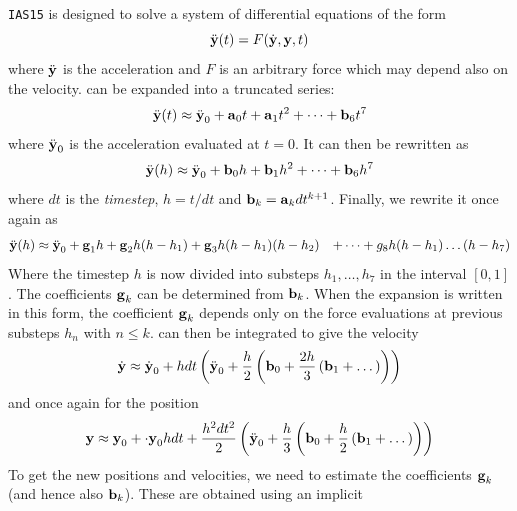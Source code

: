 \documentclass[ twoside,openright,titlepage,numbers=noenddot,headinclude,%
                footinclude=true,cleardoublepage=empty,abstractoff, %
                BCOR=5mm,paper=a4,fontsize=11pt,%
                american,%
                ]{scrreprt}
\begin{document}
\texttt{IAS15} is designed to solve a system of differential equations of the form
\begin{equation}
    \ddot{\boldsymbol{\mathbf{y}}}(t)=F(\dot{\boldsymbol{\mathbf{y}}},\boldsymbol{\mathbf{y}},t)
    \label{eq:diff_eq}
\end{equation}
where $\ddot{\boldsymbol{\mathbf{y}}}$ is the acceleration and $F$ is an arbitrary force
which may depend also on the velocity.  can be expanded
into a truncated series:
\begin{equation}
    \ddot{\boldsymbol{\mathbf{y}}}(t)\approx \ddot{\boldsymbol{\mathbf{y}}}_0 + \boldsymbol{\mathbf{a}}_0t+\boldsymbol{\mathbf{a}}_1t^2
    +\dots+\boldsymbol{\mathbf{b}}_6t^7
\end{equation}
where $\ddot{\boldsymbol{\mathbf{y}}}_0$ is the acceleration evaluated at $t=0$. 
It can then be rewritten as
\begin{equation}
    \ddot{\boldsymbol{\mathbf{y}}}(h)\approx \ddot{\boldsymbol{\mathbf{y}}}_0 + \boldsymbol{\mathbf{b}}_0h+\boldsymbol{\mathbf{b}}_1h^2
    +\dots+\boldsymbol{\mathbf{b}}_6h^7
    \label{eq:diff_eq2}
\end{equation}
where $dt$ is the \emph{timestep}, $h=t/dt$ and $\boldsymbol{\mathbf{b}}_k=\boldsymbol{\mathbf{a}}_kdt^{k+1}$.
Finally, we rewrite it once again as
\begin{equation}
    \begin{aligned}
        \ddot{\boldsymbol{\mathbf{y}}}(h)&\approx \ddot{\boldsymbol{\mathbf{y}}}_0 + \boldsymbol{\mathbf{g}}_1h+\boldsymbol{\mathbf{g}}_2h
        (h-h_1)+\boldsymbol{\mathbf{g}}_3h(h-h_1)(h-h_2)&+\dots+g_8h(h-h_1)\dots(h-h_7)
    \end{aligned}
\end{equation}
Where the timestep $h$ is now divided into substeps $h_1,\dots,h_7$ in the
interval $[0,1]$. The coefficients $\boldsymbol{\mathbf{g}}_k$ can be determined from 
$\boldsymbol{\mathbf{b}}_k$. When the expansion is written in this form, the coefficient 
$\boldsymbol{\mathbf{g}}_k$ depends only on the force evaluations at previous substeps
$h_n$ with $n\leq k$.  can then be integrated to give the velocity
\begin{equation}
    \dot{\boldsymbol{\mathbf{y}}}\approx \dot{\boldsymbol{\mathbf{y}}}_0+hdt\left(\ddot{\boldsymbol{\mathbf{y}}}_0+
    \frac{h}{2} \left(\boldsymbol{\mathbf{b}}_0+ \frac{2h}{3} \left(\boldsymbol{\mathbf{b}}_1+\dots\right)
    \right)\right)
\end{equation}
and once again for the position
\begin{equation}
    \boldsymbol{\mathbf{y}}\approx\boldsymbol{\mathbf{y}}_0+\cdot{\boldsymbol{\mathbf{y}}}_0hdt+ \frac{h^2dt^2}{2} 
    \left(\ddot{\boldsymbol{\mathbf{y}}}_0+
    \frac{h}{3} \left(\boldsymbol{\mathbf{b}}_0+ \frac{h}{2} \left(\boldsymbol{\mathbf{b}}_1+\dots\right)
    \right)\right)
\end{equation}
To get the new positions and velocities, we need to estimate the coefficients
$\boldsymbol{\mathbf{g}}_k$ (and hence also $\boldsymbol{\mathbf{b}}_k$). These are obtained using an implicit
\end{document}
